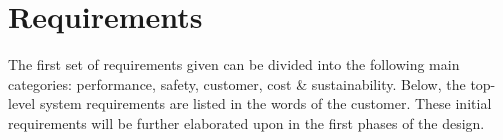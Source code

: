 \section{Requirements}\label{sec:customer-requirements}
The first set of requirements given can be divided into the following main categories: performance, safety, customer, cost \& sustainability.
Below, the top-level system requirements are listed in the words of the customer. These initial requirements will be further elaborated upon in the first phases of the design. 



